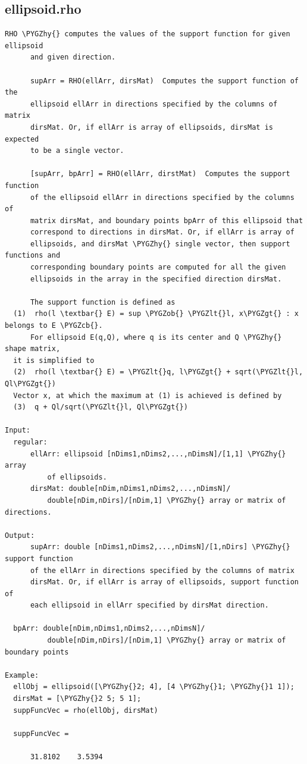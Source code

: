 \documentclass[letterpaper,10pt,english]{sphinxmanual}
\def\PYGZob{\char`\{}
\def\PYGZcb{\char`\}}
\def\PYGZlt{\char`\<}
\def\PYGZgt{\char`\>}
\def\PYGZhy{\char`\-}
\begin{document}
\subsection{ellipsoid.rho}
\label{chap_functions:ellipsoid-rho}
\begin{Verbatim}[commandchars=\\\{\}]
RHO \PYGZhy{} computes the values of the support function for given ellipsoid
      and given direction.

      supArr = RHO(ellArr, dirsMat)  Computes the support function of the
      ellipsoid ellArr in directions specified by the columns of matrix
      dirsMat. Or, if ellArr is array of ellipsoids, dirsMat is expected
      to be a single vector.

      [supArr, bpArr] = RHO(ellArr, dirstMat)  Computes the support function
      of the ellipsoid ellArr in directions specified by the columns of
      matrix dirsMat, and boundary points bpArr of this ellipsoid that
      correspond to directions in dirsMat. Or, if ellArr is array of
      ellipsoids, and dirsMat \PYGZhy{} single vector, then support functions and
      corresponding boundary points are computed for all the given
      ellipsoids in the array in the specified direction dirsMat.

      The support function is defined as
  (1)  rho(l \textbar{} E) = sup \PYGZob{} \PYGZlt{}l, x\PYGZgt{} : x belongs to E \PYGZcb{}.
      For ellipsoid E(q,Q), where q is its center and Q \PYGZhy{} shape matrix,
  it is simplified to
  (2)  rho(l \textbar{} E) = \PYGZlt{}q, l\PYGZgt{} + sqrt(\PYGZlt{}l, Ql\PYGZgt{})
  Vector x, at which the maximum at (1) is achieved is defined by
  (3)  q + Ql/sqrt(\PYGZlt{}l, Ql\PYGZgt{})

Input:
  regular:
      ellArr: ellipsoid [nDims1,nDims2,...,nDimsN]/[1,1] \PYGZhy{} array
          of ellipsoids.
      dirsMat: double[nDim,nDims1,nDims2,...,nDimsN]/
          double[nDim,nDirs]/[nDim,1] \PYGZhy{} array or matrix of directions.

Output:
      supArr: double [nDims1,nDims2,...,nDimsN]/[1,nDirs] \PYGZhy{} support function
      of the ellArr in directions specified by the columns of matrix
      dirsMat. Or, if ellArr is array of ellipsoids, support function of
      each ellipsoid in ellArr specified by dirsMat direction.

  bpArr: double[nDim,nDims1,nDims2,...,nDimsN]/
          double[nDim,nDirs]/[nDim,1] \PYGZhy{} array or matrix of boundary points

Example:
  ellObj = ellipsoid([\PYGZhy{}2; 4], [4 \PYGZhy{}1; \PYGZhy{}1 1]);
  dirsMat = [\PYGZhy{}2 5; 5 1];
  suppFuncVec = rho(ellObj, dirsMat)

  suppFuncVec =

      31.8102    3.5394
\end{Verbatim}
\end{document}
